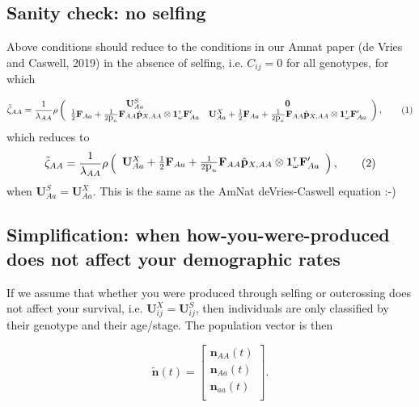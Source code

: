 \documentclass[11pt]{article}
\newcommand\numberthis{\addtocounter{equation}{1}\tag{\theequation}}
\def\mbf#1{\mathbf{#1}}
\newcommand{\tr}{{\mbox{\tiny \sf T}}}
\begin{document}
\begin{landscape}
\subsection*{Sanity check: no selfing}
Above conditions should reduce to the conditions in our Amnat paper (de Vries and Caswell, 2019) in the absence of selfing, i.e. $C_{ij}=0$ for all genotypes, for which

\begin{align*} \label{eq:eigAA}
	\tilde{\zeta}_{AA} = 
		\frac{1}{\lambda_{AA}}\rho\left(\begin{array}{cc}
\mathbf{U}^S_{Aa}  & \mathbf{0} \\
 \frac{1}{2} \mbf{F}_{Aa}+\frac{1}{2\mbox{p}_{n}}\mbf{F}_{AA} \hat{\mbf{p}}_{X,AA} \otimes \mathbf{1}^\tr_{\omega} \mathbf{F}_{Aa}^\prime &\mathbf{U}^X_{Aa} + \frac{1}{2} \mbf{F}_{Aa} +\frac{1}{2\mbox{p}_{n}} \mbf{F}_{AA} \hat{\mbf{p}}_{X,AA} \otimes \mathbf{1}^\tr_{\omega} \mathbf{F}_{Aa}^\prime
			\end{array} \right), \numberthis
\end{align*}
which reduces to 
\begin{align*} \label{eq:eigAA}
	\tilde{\zeta}_{AA} = 
		\frac{1}{\lambda_{AA}}\rho\left(\begin{array}{c}
\mathbf{U}^X_{Aa} + \frac{1}{2} \mbf{F}_{Aa} +\frac{1}{2\mbox{p}_{n}} \mbf{F}_{AA} \hat{\mbf{p}}_{X,AA} \otimes \mathbf{1}^\tr_{\omega} \mathbf{F}_{Aa}^\prime
			\end{array} \right), \numberthis
\end{align*}
when $\mathbf{U}^S_{Aa}=\mathbf{U}^X_{Aa}$. This is the same as the AmNat deVries-Caswell equation :-) 

\newpage


\subsection*{Simplification: when how-you-were-produced does not affect your demographic rates}
If we assume that whether you were produced through selfing or outcrossing does not affect your survival, i.e. $\mathbf{U}^X_{ij}=\mathbf{U}^S_{ij}$, then individuals are only classified by their genotype and their age/stage. The population vector is then 

\begin{equation}
	\tilde{\mbf{n}}(t) =  \left[
								\begin{array}{c}
									\mbf{n}_{AA}(t) \\
									\mbf{n}_{Aa}(t) \\
									\mbf{n}_{aa}(t) \\ 
						\end{array} \right].
\end{equation}


\end{landscape}
\end{document}

